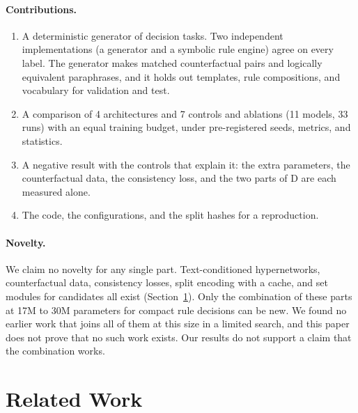 \documentclass[11pt,a4paper]{article}
\begin{document}
\paragraph{Contributions.}
\begin{enumerate}
  \item A deterministic generator of decision tasks. Two independent implementations (a generator and a symbolic rule engine) agree on every label. The generator makes matched counterfactual pairs and logically equivalent paraphrases, and it holds out templates, rule compositions, and vocabulary for validation and test.
  \item A comparison of 4 architectures and 7 controls and ablations (11 models, 33 runs) with an equal training budget, under pre-registered seeds, metrics, and statistics.
  \item A negative result with the controls that explain it: the extra parameters, the counterfactual data, the consistency loss, and the two parts of D are each measured alone.
  \item The code, the configurations, and the split hashes for a reproduction.
\end{enumerate}

\paragraph{Novelty.}
We claim no novelty for any single part.
Text-conditioned hypernetworks, counterfactual data, consistency losses, split encoding with a cache, and set modules for candidates all exist (Section~\ref{sec:related}).
Only the combination of these parts at 17M to 30M parameters for compact rule decisions can be new.
We found no earlier work that joins all of them at this size in a limited search, and this paper does not prove that no such work exists.
Our results do not support a claim that the combination works.

\section{Related Work}\label{sec:related}
\end{document}
